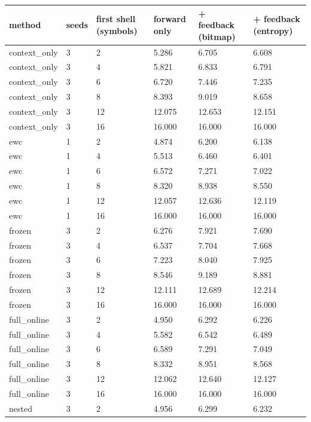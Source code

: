\begin{tabular}{llllll}
\hline
method & seeds & first shell (symbols) & forward only & + feedback (bitmap) & + feedback (entropy) \\
\hline
context\_only & 3 & 2 & 5.286 & 6.705 & 6.608 \\
context\_only & 3 & 4 & 5.821 & 6.833 & 6.791 \\
context\_only & 3 & 6 & 6.720 & 7.446 & 7.235 \\
context\_only & 3 & 8 & 8.393 & 9.019 & 8.658 \\
context\_only & 3 & 12 & 12.075 & 12.653 & 12.151 \\
context\_only & 3 & 16 & 16.000 & 16.000 & 16.000 \\
ewc & 1 & 2 & 4.874 & 6.200 & 6.138 \\
ewc & 1 & 4 & 5.513 & 6.460 & 6.401 \\
ewc & 1 & 6 & 6.572 & 7.271 & 7.022 \\
ewc & 1 & 8 & 8.320 & 8.938 & 8.550 \\
ewc & 1 & 12 & 12.057 & 12.636 & 12.119 \\
ewc & 1 & 16 & 16.000 & 16.000 & 16.000 \\
frozen & 3 & 2 & 6.276 & 7.921 & 7.690 \\
frozen & 3 & 4 & 6.537 & 7.704 & 7.668 \\
frozen & 3 & 6 & 7.223 & 8.040 & 7.925 \\
frozen & 3 & 8 & 8.546 & 9.189 & 8.881 \\
frozen & 3 & 12 & 12.111 & 12.689 & 12.214 \\
frozen & 3 & 16 & 16.000 & 16.000 & 16.000 \\
full\_online & 3 & 2 & 4.950 & 6.292 & 6.226 \\
full\_online & 3 & 4 & 5.582 & 6.542 & 6.489 \\
full\_online & 3 & 6 & 6.589 & 7.291 & 7.049 \\
full\_online & 3 & 8 & 8.332 & 8.951 & 8.568 \\
full\_online & 3 & 12 & 12.062 & 12.640 & 12.127 \\
full\_online & 3 & 16 & 16.000 & 16.000 & 16.000 \\
nested & 3 & 2 & 4.956 & 6.299 & 6.232 \\

\end{tabular}
